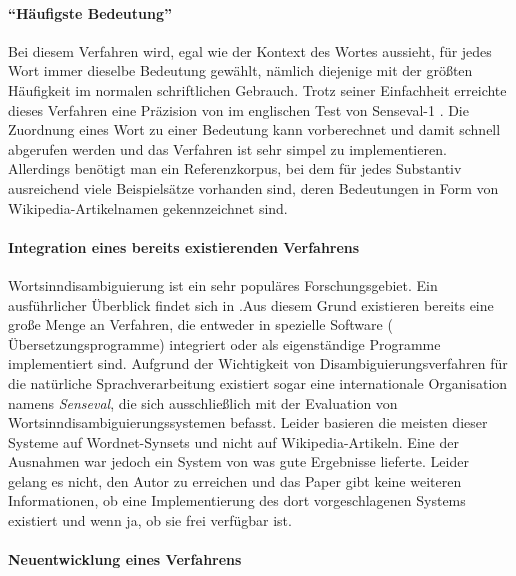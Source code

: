 \paragraph{"`Häufigste Bedeutung"'}
Bei diesem Verfahren wird, egal wie der Kontext des Wortes aussieht, für jedes Wort immer dieselbe Bedeutung gewählt, nämlich diejenige mit der größten Häufigkeit im normalen schriftlichen Gebrauch.\footnotemark{}
Trotz seiner Einfachheit erreichte dieses Verfahren eine Präzision von  im englischen Test von Senseval-1 \citep{wsd-survey}.\footnotemark{}
Die Zuordnung eines Wort zu einer Bedeutung kann vorberechnet und damit schnell abgerufen werden und das Verfahren ist sehr simpel zu implementieren.
Allerdings benötigt man ein Referenzkorpus, bei dem für jedes Substantiv ausreichend viele Beispielsätze vorhanden sind, deren Bedeutungen in Form von Wikipedia-Artikelnamen gekennzeichnet sind.

\paragraph{Integration eines bereits existierenden Verfahrens}
Wortsinndisambiguierung ist ein sehr populäres Forschungsgebiet. Ein ausführlicher Überblick findet sich in \cite{wsd-stateoftheart}.Aus diesem Grund existieren bereits eine große Menge an Verfahren, die entweder in spezielle Software (\zb{} Übersetzungsprogramme) integriert
oder als eigenständige Programme implementiert sind. Aufgrund der Wichtigkeit von Disambiguierungsverfahren für die natürliche Sprachverarbeitung existiert sogar eine internationale Organisation
namens \emph{Senseval}, die sich ausschließlich mit der Evaluation von Wortsinndisambiguierungssystemen befasst.
Leider basieren die meisten dieser Systeme auf Wordnet-Synsets und nicht auf Wikipedia-Artikeln.
Eine der Ausnahmen war jedoch ein System von \citet{cucerzan2007} was gute Ergebnisse lieferte.
Leider gelang es nicht, den Autor zu erreichen und das Paper gibt keine weiteren Informationen, ob eine Implementierung des dort vorgeschlagenen Systems existiert und wenn ja, ob sie frei verfügbar ist.

\paragraph{Neuentwicklung eines Verfahrens}

